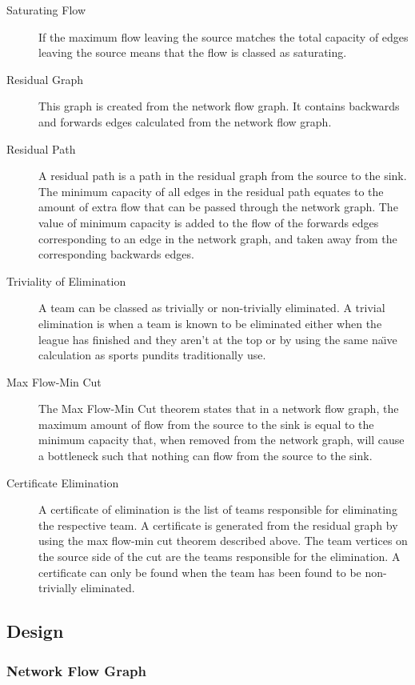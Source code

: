 \begin{description}
\item[Saturating Flow] If the maximum flow leaving the source matches the total
capacity of edges leaving the source means that the flow is classed as
saturating.

\item[Residual Graph] This graph is created from the network flow graph. It
contains backwards and forwards edges calculated from the network flow
graph.

\item[Residual Path] A residual path is a path in the residual graph from
the source to the sink. The minimum capacity of all edges in the residual
path equates to the amount of extra flow that can be passed through the
network graph. The value of minimum capacity is added to the flow of
the forwards edges corresponding to an edge in the network graph, and taken
away from the corresponding backwards edges.

\item[Triviality of Elimination] A team can be classed as trivially or
non-trivially eliminated. A trivial elimination is when a team is known to be
eliminated either when the league has finished and they aren't at the top or
by using the same na\"{\i}ve calculation as sports pundits traditionally
use.

\item[Max Flow-Min Cut] The Max Flow-Min Cut theorem states that in a network
flow graph, the maximum amount of flow from the source to the sink is equal
to the minimum capacity that, when removed from the network graph, will
cause a bottleneck such that nothing can flow from the source to the sink.

\item[Certificate Elimination] A certificate of elimination is the list of
teams responsible for eliminating the respective team. A certificate is
generated from the residual graph by using the max flow-min cut theorem
described above. The team vertices on the source side of the cut are the
teams responsible for the elimination. A certificate can only be found when
the team has been found to be non-trivially eliminated.

\end{description}

\subsection{Design}

\subsubsection{Network Flow Graph}

